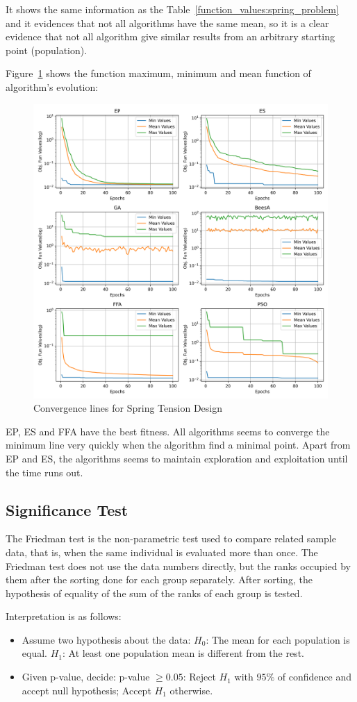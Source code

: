 \documentclass[conference]{IEEEtran}
\begin{document}
It shows the same information as the Table~\ref{function_values:spring_problem}
and it evidences that not all algorithms have the same mean, so it is a clear evidence
that not all algorithm give similar results from an arbitrary starting point (population).

Figure~\ref{fig:spring_problem_convergence} shows the
function maximum, minimum and mean function of algorithm's evolution:

\begin{figure}[H]
\centering
\caption{Convergence lines for Spring Tension Design}
\label{fig:spring_problem_convergence}
\includegraphics[width=0.4 \textwidth]{images/spring_problem_convergence.png}
\end{figure}

EP, ES and FFA have the best fitness.
All algorithms seems to converge the minimum line very quickly when
the algorithm find a minimal point.
Apart from EP and ES, the algorithms seems to maintain exploration and exploitation
until the time runs out.


\subsection{Significance Test}
\label{subsec:pressure_vessel_problem_significance_test}

The Friedman test is the non-parametric test used to compare related sample data, that is,
when the same individual is evaluated more than once.
The Friedman test does not use the data numbers directly, but the ranks occupied by
them after the sorting done for each group separately. After sorting, the hypothesis
of equality of the sum of the ranks of each group is tested.

Interpretation is as follows:
\begin{itemize}
    \item Assume two hypothesis about the data:
        \subitem $H_0$: The mean for each population is equal.
        \subitem $H_1$: At least one population mean is different from the rest.
    \item Given p-value, decide:
        \subitem p-value $\geq 0.05$: Reject $H_1$ with $95\%$ of confidence and accept null hypothesis;
        \subitem Accept $H_1$ otherwise.
\end{itemize}
\end{document}
